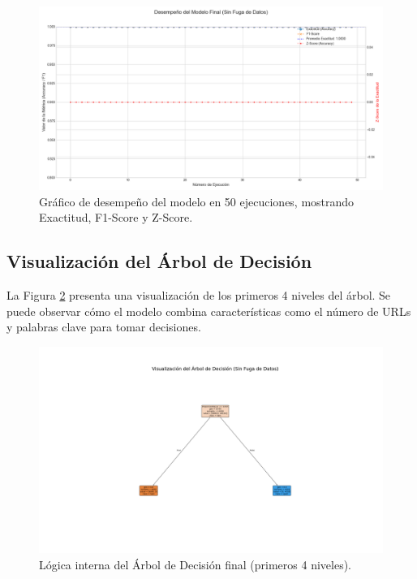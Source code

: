 \documentclass[12pt, a4paper]{article}
\begin{document}
\begin{figure}[H]
    \centering
    \includegraphics[width=\textwidth]{img/desempeno_final.png}
    \caption{Gráfico de desempeño del modelo en 50 ejecuciones, mostrando Exactitud, F1-Score y Z-Score.}
    \label{fig:desempeno}
\end{figure}

\subsection{Visualización del Árbol de Decisión}
La Figura \ref{fig:arbol} presenta una visualización de los primeros 4 niveles del árbol. Se puede observar cómo el modelo combina características como el número de URLs y palabras clave para tomar decisiones.

\begin{figure}[H]
    \centering
    \includegraphics[width=\textwidth]{img/arbol_de_decision_final.png}
    \caption{Lógica interna del Árbol de Decisión final (primeros 4 niveles).}
    \label{fig:arbol}
\end{figure}
\end{document}
